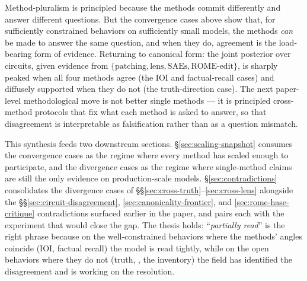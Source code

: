 \begin{intuition}
Method-pluralism is principled because the methods commit
differently and answer different questions. But the convergence
cases above show that, for sufficiently constrained behaviors on
sufficiently small models, the methods \emph{can} be made to
answer the same question, and when they do, agreement is the
load-bearing form of evidence. Returning to canonical form: the
joint posterior over circuits, given evidence from
$\{\text{patching}, \text{lens}, \text{SAEs}, \text{ROME-edit}\}$,
is sharply peaked when all four methods agree (the IOI and
factual-recall cases) and diffusely supported when they do not
(the truth-direction case). The next paper-level methodological
move is not better single methods --- it is principled
cross-method protocols that fix what each method is asked to
answer, so that disagreement is interpretable as falsification
rather than as a question mismatch.
\end{intuition}

This synthesis feeds two downstream sections.
\S\ref{sec:scaling-snapshot} consumes the convergence cases as the
regime where every method has scaled enough to participate, and
the divergence cases as the regime where single-method claims are
still the only evidence on production-scale models.
\S\ref{sec:contradictions} consolidates the divergence cases of
\S\S\ref{sec:cross-truth}--\ref{sec:cross-lens} alongside the
\S\S\ref{sec:circuit-disagreement}, \ref{sec:canonicality-frontier},
and \ref{sec:rome-hase-critique} contradictions surfaced earlier
in the paper, and pairs each with the experiment that would close
the gap. The thesis holds: ``\emph{partially read}'' is the right
phrase because on the well-constrained behaviors where the methods'
angles coincide (IOI, factual recall) the model is read tightly,
while on the open behaviors where they do not (truth, ,
the   inventory) the field has identified the
disagreement and is working on the resolution.
